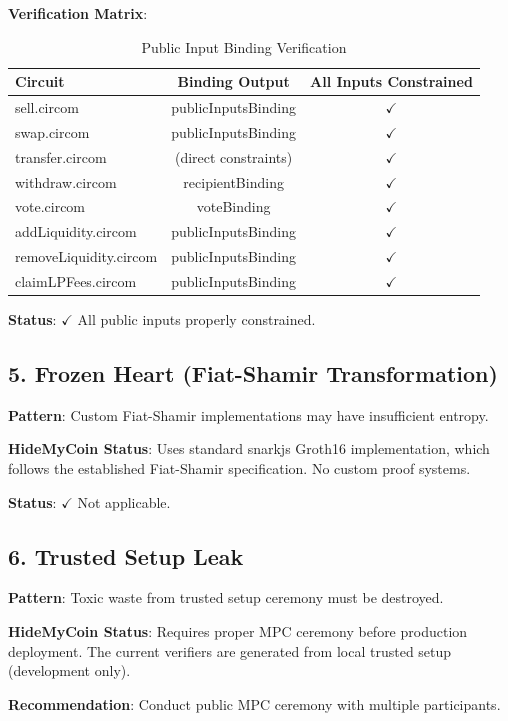 \documentclass[11pt,a4paper]{article}
\begin{document}
\textbf{Verification Matrix}:
\begin{table}[H]
\centering
\begin{tabular}{|l|c|c|}
\hline
\textbf{Circuit} & \textbf{Binding Output} & \textbf{All Inputs Constrained} \\
\hline
sell.circom & publicInputsBinding & $\checkmark$ \\
swap.circom & publicInputsBinding & $\checkmark$ \\
transfer.circom & (direct constraints) & $\checkmark$ \\
withdraw.circom & recipientBinding & $\checkmark$ \\
vote.circom & voteBinding & $\checkmark$ \\
addLiquidity.circom & publicInputsBinding & $\checkmark$ \\
removeLiquidity.circom & publicInputsBinding & $\checkmark$ \\
claimLPFees.circom & publicInputsBinding & $\checkmark$ \\
\hline
\end{tabular}
\caption{Public Input Binding Verification}
\end{table}

\textbf{Status}: $\checkmark$ All public inputs properly constrained.

\subsection{5. Frozen Heart (Fiat-Shamir Transformation)}

\textbf{Pattern}: Custom Fiat-Shamir implementations may have insufficient entropy.

\textbf{HideMyCoin Status}: Uses standard snarkjs Groth16 implementation, which follows the established Fiat-Shamir specification. No custom proof systems.

\textbf{Status}: $\checkmark$ Not applicable.

\subsection{6. Trusted Setup Leak}

\textbf{Pattern}: Toxic waste from trusted setup ceremony must be destroyed.

\textbf{HideMyCoin Status}: Requires proper MPC ceremony before production deployment. The current verifiers are generated from local trusted setup (development only).

\textbf{Recommendation}: Conduct public MPC ceremony with multiple participants.
\end{document}
